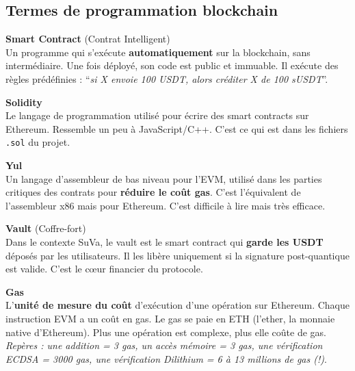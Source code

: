 \documentclass[12pt, a4paper]{article}
\begin{document}
\vspace{0.4cm}

\subsection{Termes de programmation blockchain}

\begin{tcolorbox}[colback=gray!4, colframe=gray!50, breakable]

\textbf{Smart Contract} (Contrat Intelligent)\\
\hspace*{1em} Un programme qui s'exécute \textbf{automatiquement} sur la blockchain, sans
intermédiaire. Une fois déployé, son code est public et immuable. Il exécute des règles
prédéfinies : ``\textit{si X envoie 100 USDT, alors créditer X de 100 sUSDT}''.

\vspace{0.4cm}

\textbf{Solidity}\\
\hspace*{1em} Le langage de programmation utilisé pour écrire des smart contracts sur Ethereum.
Ressemble un peu à JavaScript/C++. C'est ce qui est dans les fichiers \texttt{.sol} du projet.

\vspace{0.4cm}

\textbf{Yul}\\
\hspace*{1em} Un langage d'assembleur de bas niveau pour l'EVM, utilisé dans les parties critiques
des contrats pour \textbf{réduire le coût gas}. C'est l'équivalent de l'assembleur x86 mais pour
Ethereum. C'est difficile à lire mais très efficace.

\vspace{0.4cm}

\textbf{Vault} (Coffre-fort)\\
\hspace*{1em} Dans le contexte SuVa, le vault est le smart contract qui \textbf{garde les USDT}
déposés par les utilisateurs. Il les libère uniquement si la signature post-quantique est valide.
C'est le c\oe{}ur financier du protocole.

\vspace{0.4cm}

\textbf{Gas}\\
\hspace*{1em} L'\textbf{unité de mesure du coût} d'exécution d'une opération sur Ethereum.
Chaque instruction EVM a un coût en gas. Le gas se paie en ETH (l'ether, la monnaie native
d'Ethereum). Plus une opération est complexe, plus elle coûte de gas.\\
\hspace*{1em} \textit{Repères : une addition = 3 gas, un accès mémoire = 3 gas, une vérification
ECDSA = 3000 gas, une vérification Dilithium = 6 à 13 millions de gas (!)}.


\end{tcolorbox}
\end{document}
